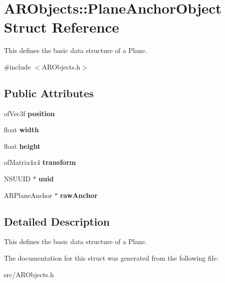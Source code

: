 \hypertarget{struct_a_r_objects_1_1_plane_anchor_object}{}\section{A\+R\+Objects\+:\+:Plane\+Anchor\+Object Struct Reference}
\label{struct_a_r_objects_1_1_plane_anchor_object}


This defines the basic data structure of a Plane.  




{\ttfamily \#include $<$A\+R\+Objects.\+h$>$}

\subsection*{Public Attributes}
\begin{DoxyCompactItemize}
\item 
\mbox{\label{struct_a_r_objects_1_1_plane_anchor_object_a1e91b9c289ed6a8379e8106479b30650}} 
of\+Vec3f {\bfseries position}
\item 
\mbox{\label{struct_a_r_objects_1_1_plane_anchor_object_a66571f63611c3fe8c8161c18b5d163cc}} 
float {\bfseries width}
\item 
\mbox{\label{struct_a_r_objects_1_1_plane_anchor_object_a7114f6bc16cf36662c1a73e34d2d2314}} 
float {\bfseries height}
\item 
\mbox{\label{struct_a_r_objects_1_1_plane_anchor_object_a683ab536baa0f5b81b11deeca121ce5b}} 
of\+Matrix4x4 {\bfseries transform}
\item 
\mbox{\label{struct_a_r_objects_1_1_plane_anchor_object_ab20601adc6ffd5698f0c91acf861c92b}} 
N\+S\+U\+U\+ID $\ast$ {\bfseries uuid}
\item 
\mbox{\label{struct_a_r_objects_1_1_plane_anchor_object_a4d6b3acc9e0a17fe3f5357f99a176101}} 
A\+R\+Plane\+Anchor $\ast$ {\bfseries raw\+Anchor}
\end{DoxyCompactItemize}


\subsection{Detailed Description}
This defines the basic data structure of a Plane. 

The documentation for this struct was generated from the following file\+:\begin{DoxyCompactItemize}
\item 
src/A\+R\+Objects.\+h\end{DoxyCompactItemize}
